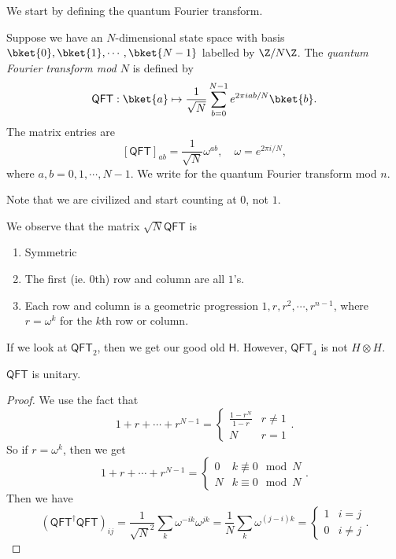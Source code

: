 \documentclass[a4paper]{article}
\newcommand{\qQFT}{\mathsf{QFT}}
\newcommand{\qH}{\mathsf{H}}
\begin{document}
We start by defining the quantum Fourier transform.
\begin{defi}
  Suppose we have an $N$-dimensional state space with basis $\bket{0}, \bket{1}, \cdots, \bket{N - 1}$ labelled by $\Z/N\Z$. The \emph{quantum Fourier transform mod $N$} is defined by
  \[
    \qQFT: \bket{a} \mapsto \frac{1}{\sqrt{N}} \sum_{b = 0}^{N - 1} e^{2\pi i ab/N} \bket{b}.
  \]
  The matrix entries are
  \[
    [\qQFT]_{ab} = \frac{1}{\sqrt{N}} \omega^{ab},\quad \omega = e^{2\pi i/N},
  \]
  where $a, b = 0, 1, \cdots, N - 1$. We write \term{$\qQFT_n$} for the quantum Fourier transform mod $n$.
\end{defi}
Note that we are civilized and start counting at $0$, not $1$.

We observe that the matrix $\sqrt{N}\qQFT$ is
\begin{enumerate}
  \item Symmetric
  \item The first (ie. $0$th) row and column are all $1$'s.
  \item Each row and column is a geometric progression $1, r, r^2, \cdots, r^{n - 1}$, where $r = \omega^k$ for the $k$th row or column.
\end{enumerate}

\begin{eg}
  If we look at $\qQFT_2$, then we get our good old $\qH$. However, $\qQFT_4$ is not $H \otimes H$.
\end{eg}

\begin{prop}
  $\qQFT$ is unitary.
\end{prop}

\begin{proof}
  We use the fact that
  \[
    1 + r + \cdots + r^{N - 1} =
    \begin{cases}
      \frac{1 - r^N}{1 - r} & r \not= 1\\
      N & r = 1
    \end{cases}.
  \]
  So if $r = \omega^k$, then we get
  \[
    1 + r + \cdots + r^{N - 1} =
    \begin{cases}
      0 & k \not\equiv 0 \mod N\\
      N & k \equiv 0 \mod N
    \end{cases}.
  \]
  Then we have
  \[
    (\qQFT^\dagger \qQFT)_{ij} = \frac{1}{\sqrt{N}^2} \sum_k \omega^{-ik} \omega^{jk} =\frac{1}{N} \sum_k \omega^{(j-i)k} =
    \begin{cases}
      1 & i = j\\
      0 & i \not= j
    \end{cases}.
  \]
\end{proof}
\end{document}
